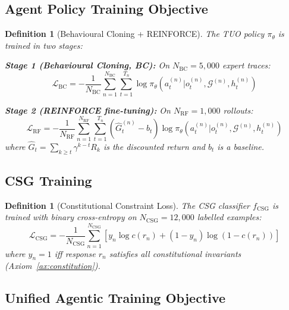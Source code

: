 \documentclass[10pt,conference]{IEEEtran}
\theoremstyle{ieeethm}
\theoremstyle{ieeedef}
\newtheorem{definition}[theorem]{Definition}
\theoremstyle{ieeeremark}
\begin{document}
\subsection{Agent Policy Training Objective}

\begin{definition}[Behavioural Cloning + REINFORCE]
\label{def:policy_training}
The TUO policy $\pi_\theta$ is trained in two stages:

\textbf{Stage 1 (Behavioural Cloning, BC):} On $N_\text{BC} = 5{,}000$ expert traces:
\begin{equation}
\mathcal{L}_\text{BC} = -\frac{1}{N_\text{BC}} \sum_{n=1}^{N_\text{BC}} \sum_{t=1}^{T_n} \log \pi_\theta(a_t^{(n)} | o_t^{(n)}, \mathcal{G}^{(n)}, h_t^{(n)})
\label{eq:bc_loss}
\end{equation}

\textbf{Stage 2 (REINFORCE fine-tuning):} On $N_\text{RF} = 1{,}000$ rollouts:
\begin{equation}
\mathcal{L}_\text{RF} = -\frac{1}{N_\text{RF}} \sum_{n=1}^{N_\text{RF}} \sum_{t=1}^{T_n} \left(\hat{G}_t^{(n)} - b_t\right) \log \pi_\theta(a_t^{(n)}|o_t^{(n)}, \mathcal{G}^{(n)}, h_t^{(n)})
\label{eq:rf_loss}
\end{equation}
where $\hat{G}_t = \sum_{k \geq t} \gamma^{k-t} R_k$ is the discounted return and $b_t$ is a baseline.
\end{definition}

\subsection{CSG Training}

\begin{definition}[Constitutional Constraint Loss]
\label{def:csg_loss}
The CSG classifier $f_\text{CSG}$ is trained with binary cross-entropy on $N_\text{CSG} = 12{,}000$ labelled examples:
\begin{equation}
\mathcal{L}_\text{CSG} = -\frac{1}{N_\text{CSG}} \sum_{n=1}^{N_\text{CSG}} \left[y_n \log c(r_n) + (1-y_n)\log(1-c(r_n))\right]
\label{eq:csg_loss}
\end{equation}
where $y_n = 1$ iff response $r_n$ satisfies all constitutional invariants (Axiom~\ref{ax:constitution}).
\end{definition}

\subsection{Unified Agentic Training Objective}
\end{document}
